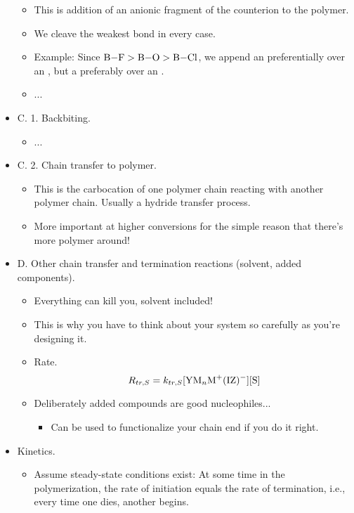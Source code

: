 \documentclass[../notes.tex]{subfiles}
\begin{document}
\begin{itemize}
\begin{itemize}
        \item This is addition of an anionic fragment of the counterion to the polymer.
        \item We cleave the weakest bond in every case.
        \item Example: Since $\ce{B-F}>\ce{B-O}>\ce{B-Cl}$, we append an  preferentially over an , but a  preferably over an .
        \item ...
    \end{itemize}
    \item C. 1. Backbiting.
    \begin{itemize}
        \item ...
    \end{itemize}
    \item C. 2. Chain transfer to polymer.
    \begin{itemize}
        \item This is the carbocation of one polymer chain reacting with another polymer chain. Usually a hydride transfer process.
        \item More important at higher conversions for the simple reason that there's more polymer around!
    \end{itemize}
    \item D. Other chain transfer and termination reactions (solvent, added components).
    \begin{itemize}
        \item Everything can kill you, solvent included!
        \item This is why you have to think about your system so carefully as you're designing it.
        \item Rate.
        \begin{equation*}
            R_{tr,S} = k_{tr,S}[\ce{YM_nM+(IZ)-}][\ce{S}]
        \end{equation*}
        \item Deliberately added compounds are good nucleophiles...
        \begin{itemize}
            \item Can be used to functionalize your chain end if you do it right.
        \end{itemize}
    \end{itemize}
    \item Kinetics.
    \begin{itemize}
        \item Assume steady-state conditions exist: At some time in the polymerization, the rate of initiation equals the rate of termination, i.e., every time one dies, another begins.

\end{itemize}
\end{itemize}
\end{document}
